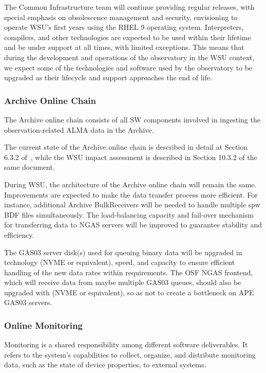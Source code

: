 The Common Infrastructure team will continue providing regular releases, with special emphasis on obsolescence management and security, envisioning to operate WSU's first years using the \ac{RHEL} 9 operating system. Interpreters, compilers, and other technologies are expected to be used within their lifetime and be under support at all times, with limited exceptions. This means that during the development and operations of the observatory in the WSU context, we expect some of the technologies and software used by the observatory to be upgraded as their lifecycle and support approaches the end of life.

\subsubsection{Archive Online Chain}
The Archive online chain consists of all SW components involved in ingesting the observation-related ALMA data in the Archive.

The current state of the Archive online chain is described in detail at Section 6.3.2 of~\cite{CSA-IA}, while the WSU impact assessment is described in Section 10.3.2 of the same document.

During WSU, the architecture of the Archive online chain will remain the same. Improvements are expected to make the data transfer process more efficient. For instance, additional Archive BulkReceivers will be needed to handle multiple spw \ac{BDF} files simultaneously. The load-balancing capacity and fail-over mechanism for transferring data to NGAS servers will be improved to guarantee stability and efficiency.

The GAS03 server disk(s) used for queuing binary data will be upgraded in technology (\ac{NVME} or equivalent), speed, and capacity to ensure efficient handling of the new data rates within requirements. The OSF NGAS frontend, which will receive data from maybe multiple GAS03 queues, should also be upgraded with (\ac{NVME} or equivalent), so as not to create a bottleneck on APE GAS03 servers.

\subsubsection{Online Monitoring}
Monitoring is a shared responsibility among different software deliverables. It refers to the system's capabilities to collect, organize, and distribute monitoring data, such as the state of device properties, to external systems.

